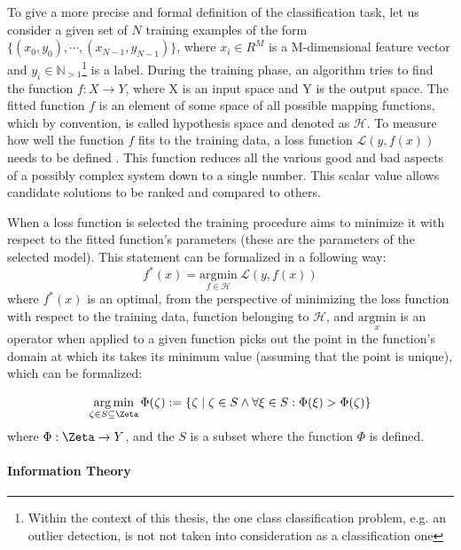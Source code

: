 To give a more precise and formal definition of the classification task, let us consider a given set of $N$ training examples of the form \\ $\{(x_0,y_0), \dotsb , (x_{N-1} , y_{N-1})\}$, where $x_{i} \in R^{M}$ is a M-dimensional feature vector and $y_i \in \mathbb{N}_{>1}$\footnote{Within the context of this thesis, the one class classification problem, e.g. an outlier detection, is not not taken into consideration as a classification one} is a label. During the training phase, an algorithm tries to find the function $f: X\rightarrow Y$, where X is an input space and Y is the output space. The fitted function $f$ is an element of some space of all possible mapping functions, which by convention, is called hypothesis space and denoted as $\mathcal{H}$. To measure how well the function $f$ fits to the training data, a loss function $\mathcal{L}(y,f(x))$ needs to be defined \cite{DLBook}. This function reduces all the various good and bad aspects of a possibly complex system down to a single number. This scalar value allows candidate solutions to be ranked and compared to others.


When a loss function is selected the training procedure aims to minimize it with respect to the fitted function's parameters (these are the parameters of the selected model). This statement can be formalized in a following way: 
\begin{equation} \label{eq:loss}
f^*(x) = \underset{f \in \mathcal{H}}{\mathrm{argmin}} ~  \mathcal{L}(y,f(x))
\end{equation}
where $f^*(x)$ is an optimal, from the perspective of minimizing the loss function with respect to the training data, function belonging to $\mathcal{H}$, and $ \underset{x}{\mathrm{argmin}}$ is an operator when applied to a given function picks out the point in the function's domain at which its takes its minimum value (assuming that the point is unique), which can be formalized:

\begin{equation}
   \underset{\zeta \in S\subseteq \Zeta}{\operatorname{arg\,min}}\, \Phi(\zeta) := \{\zeta \mid \zeta \in S \wedge \forall \xi \in S : \Phi(\xi) > \Phi(\zeta)\}
\end{equation}
where $\Phi:\Zeta \rightarrow Y$, and the $S$ is a subset where the function $\Phi$ is defined.  

\paragraph{Information Theory} \mbox{}
 
